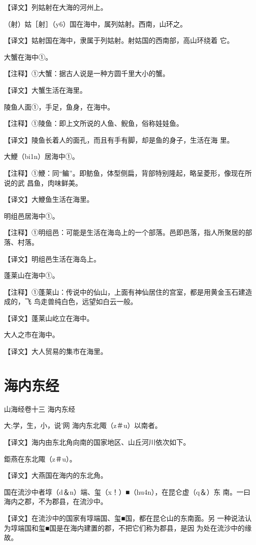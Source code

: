 \documentclass[a4paper,12pt,UTF8,twoside]{ctexbook}
\begin{document}
【译文】列姑射在大海的河州上。

（射）姑［射］（y6）国在海中，属列姑射。西南，山环之。

【译文】姑射国在海中，隶属于列姑射。射姑国的西南部，高山环绕着 它。

大蟹在海中①。

【注释】①大蟹：据古人说是一种方圆千里大小的蟹。

【译文】大蟹生活在海里。

陵鱼人面①，手足，鱼身，在海中。

【注释】①陵鱼：即上文所说的人鱼、鲵鱼，俗称娃娃鱼。

【译文】陵鱼长着人的面孔，而且有手有脚，却是鱼的身子，生活在海 里。

大鯾（bi1n）居海中①。

【注释】①鯾：同“鳊”。即鲂鱼，体型侧扁，背部特别隆起，略呈菱形，像现在所说的武 昌鱼，肉味鲜美。

【译文】大鯾鱼生活在海里。

明组邑居海中①。

【注释】①明组邑：可能是生活在海岛上的一个部落。邑即邑落，指人所聚居的部落、村落。

【译文】明组邑生活在海岛上。

蓬莱山在海中①。

【注释】①蓬莱山：传说中的仙山，上面有神仙居住的宫室，都是用黄金玉石建造成的，飞 鸟走兽纯白色，远望如白云一般。

【译文】蓬莱山屹立在海中。

大人之市在海中。

【译文】大人贸易的集市在海里。

\chapter{海内东经}

山海经卷十三 海内东经

大;学，生，小，说'网
海内东北陬（z＃u）以南者。

【译文】海内由东北角向南的国家地区、山丘河川依次如下。

鉅燕在东北陬（z＃u）。

【译文】大燕国在海内的东北角。

国在流沙中者埻（d＆n）端、玺（x！）■（hu4n），在昆仑虚（q＆）东 南。一曰海内之郡，不为郡县，在流沙中。

【译文】在流沙中的国家有埻端国、玺■国，都在昆仑山的东南面。另 一种说法认为埻端国和玺■国是在海内建置的郡，不把它们称为郡县，是因 为处在流沙中的缘故。
\end{document}
